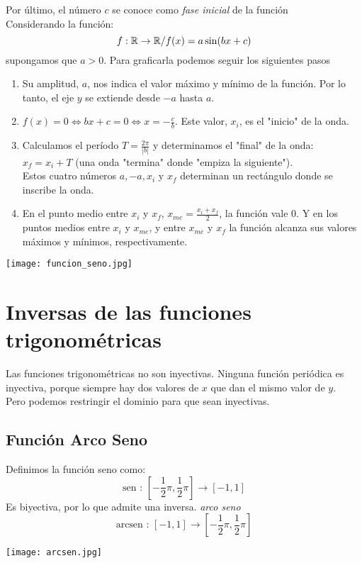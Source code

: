 Por último, el número $c$ se conoce como \emph{fase inicial} de la función\\
Considerando la función:
$$f: {\mathbb{R}} \rightarrow {\mathbb{R}} / f(x) = a \sin(bx+c)$$ 
supongamos que $a > 0$. Para graficarla podemos seguir los siguientes pasos
\begin{enumerate}
    \item Su amplitud, $a$, nos indica el valor máximo y mínimo de la función. Por lo tanto, el eje $y$ se extiende desde $-a$ hasta $a$.
    \item $f(x) = 0 \Leftrightarrow bx+c = 0 \Leftrightarrow x = -\frac{c}{b}$. Este valor, $x_i$, es el "inicio" de la onda.
    \item Calculamos el período $T = \frac{2\pi}{|b|}$ y determinamos el "final" de la onda: $x_f = x_i + T$ (una onda "termina" donde "empiza la siguiente").\\
    Estos cuatro números $a, -a, x_i$ y $x_f$ determinan un rectángulo donde se inscribe la onda.
    \item En el punto medio entre $x_i$ y $x_f$, $x_{me} = \frac{x_i + x_f}{2}$, la función vale 0. Y en los puntos medios entre $x_i$ y $x_{me}$, y entre $x_{me}$ y $x_f$ la función alcanza sus valores máximos y mínimos, respectivamente.
\end{enumerate}
\begin{center}
    \texttt{[image: funcion\_seno.jpg]}
\end{center}

\section{Inversas de las funciones trigonométricas}
Las funciones trigonométricas no son inyectivas. Ninguna función periódica es inyectiva, porque siempre hay dos valores de $x$ que dan el mismo valor de $y$.\\
Pero podemos restringir el dominio para que sean inyectivas.

\subsection{Función Arco Seno}
Definimos la función seno como: 
$$\text{sen : } \left[-\frac{1}{2}\pi , \frac{1}{2}\pi\right] \rightarrow [-1,1]$$
Es biyectiva, por lo que admite una inversa. \emph{arco seno}
$$\text{arcsen : } [-1,1] \rightarrow \left[-\frac{1}{2}\pi , \frac{1}{2}\pi\right]$$

\begin{center}
    \texttt{[image: arcsen.jpg]}
\end{center}

